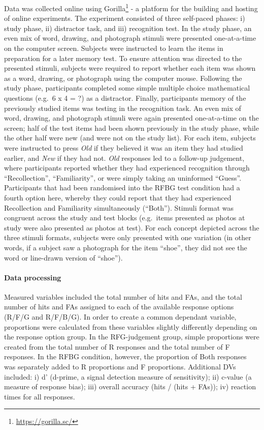 \documentclass[
  11pt,
]{article}
\begin{document}
Data was collected online using
Gorilla\footnote{\url{https://gorilla.sc/}} - a platform for the
building and hosting of online experiments. The experiment consisted of
three self-paced phases: i) study phase, ii) distractor task, and iii)
recognition test. In the study phase, an even mix of word, drawing, and
photograph stimuli were presented one-at-a-time on the computer screen.
Subjects were instructed to learn the items in preparation for a later
memory test. To ensure attention was directed to the presented stimuli,
subjects were required to report whether each item was shown as a word,
drawing, or photograph using the computer mouse. Following the study
phase, participants completed some simple multiple choice mathematical
questions (e.g.~6 x 4 = ?) as a distractor. Finally, participants memory
of the previously studied items was testing in the recognition task. An
even mix of word, drawing, and photograph stimuli were again presented
one-at-a-time on the screen; half of the test items had been shown
previously in the study phase, while the other half were new (and were
not on the study list). For each item, subjects were instructed to press
\emph{Old} if they believed it was an item they had studied earlier, and
\emph{New} if they had not. \emph{Old} responses led to a follow-up
judgement, where participants reported whether they had experienced
recognition through ``Recollection'', ``Familiarity'', or were simply
taking an uninformed ``Guess''. Participants that had been randomised
into the RFBG test condition had a fourth option here, whereby they
could report that they had experienced Recollection and Familiarity
simultaneously (``Both''). Stimuli format was congruent across the study
and test blocks (e.g.~items presented as photos at study were also
presented as photos at test). For each concept depicted across the three
stimuli formats, subjects were only presented with one variation (in
other words, if a subject saw a photograph for the item ``shoe'', they
did not see the word or line-drawn version of ``shoe'').

\hypertarget{data-processing-2}{%
\paragraph{Data processing}\label{data-processing-2}}

Measured variables included the total number of hits and FAs, and the
total number of hits and FAs assigned to each of the available response
options (R/F/G and R/F/B/G). In order to create a common dependant
variable, proportions were calculated from these variables slightly
differently depending on the response option group. In the RFG-judgement
group, simple proportions were created from the total number of R
responses and the total number of F responses. In the RFBG condition,
however, the proportion of Both responses was separately added to R
proportions and F proportions. Additional DVs included: i) d' (d-prime,
a signal detection measure of sensitivity); ii) c-value (a measure of
response bias); iii) overall accuracy (hits / (hits + FAs)); iv)
reaction times for all responses.
\end{document}
